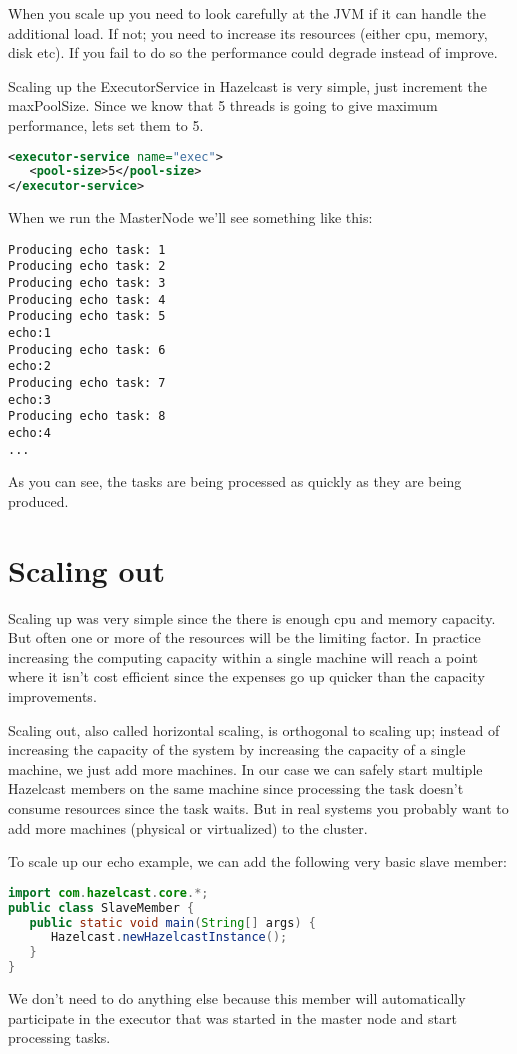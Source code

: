 When you scale up you need to look carefully at the JVM if it can handle the additional load. If not; you need to increase its resources (either cpu, memory, disk etc). If you fail to do so the performance could degrade instead of improve. 

Scaling up the ExecutorService in Hazelcast is very simple, just increment the maxPoolSize. Since we know that 5 threads is going to give maximum performance, lets set them to 5.
\begin{lstlisting}[language=xml]
<executor-service name="exec">
   <pool-size>5</pool-size>
</executor-service>
\end{lstlisting}
When we run the MasterNode we'll see something like this:
\begin{lstlisting}
Producing echo task: 1
Producing echo task: 2
Producing echo task: 3
Producing echo task: 4
Producing echo task: 5
echo:1
Producing echo task: 6
echo:2
Producing echo task: 7
echo:3
Producing echo task: 8
echo:4
...
\end{lstlisting}
As you can see, the tasks are being processed as quickly as they are being produced. 

\section{Scaling out}
Scaling up was very simple since the there is enough cpu and memory capacity. But often one or more of the resources will be the limiting factor. In practice increasing the computing capacity within a single machine will reach a point where it isn't cost efficient since the expenses go up quicker than the capacity improvements.

Scaling out, also called horizontal scaling, is orthogonal to scaling up; instead of increasing the capacity of the system by increasing the capacity of a single machine, we just add more machines. In our case we can safely start multiple Hazelcast members on the same machine since processing the task doesn't consume resources since the task waits. But in real systems you probably want to add more machines (physical or virtualized) to the cluster.

To scale up our echo example, we can add the following very basic slave member:
\begin{lstlisting}[language=java]
import com.hazelcast.core.*;
public class SlaveMember {
   public static void main(String[] args) {
      Hazelcast.newHazelcastInstance();
   }
}
\end{lstlisting}
We don't need to do anything else because this member will automatically participate in the executor that was started in the master node and start processing tasks. 

